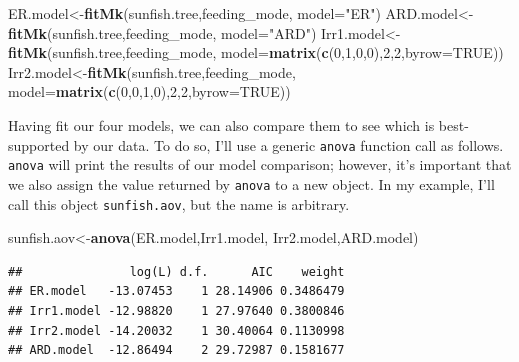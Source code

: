 \documentclass[fleqn,10pt,lineno]{wlpeerj} %
\newenvironment{Shaded}{\begin{snugshade}}{\end{snugshade}}
\newcommand{\AttributeTok}[1]{\textcolor[rgb]{0.13,0.29,0.53}{#1}}
\newcommand{\ConstantTok}[1]{\textcolor[rgb]{0.56,0.35,0.01}{#1}}
\newcommand{\DecValTok}[1]{\textcolor[rgb]{0.00,0.00,0.81}{#1}}
\newcommand{\FunctionTok}[1]{\textcolor[rgb]{0.13,0.29,0.53}{\textbf{#1}}}
\newcommand{\NormalTok}[1]{#1}
\newcommand{\OtherTok}[1]{\textcolor[rgb]{0.56,0.35,0.01}{#1}}
\newcommand{\StringTok}[1]{\textcolor[rgb]{0.31,0.60,0.02}{#1}}
\begin{document}
\begin{Shaded}
\begin{Highlighting}[]
\NormalTok{ER.model}\OtherTok{\textless{}{-}}\FunctionTok{fitMk}\NormalTok{(sunfish.tree,feeding\_mode,}
  \AttributeTok{model=}\StringTok{"ER"}\NormalTok{)}
\NormalTok{ARD.model}\OtherTok{\textless{}{-}}\FunctionTok{fitMk}\NormalTok{(sunfish.tree,feeding\_mode,}
  \AttributeTok{model=}\StringTok{"ARD"}\NormalTok{)}
\NormalTok{Irr1.model}\OtherTok{\textless{}{-}}\FunctionTok{fitMk}\NormalTok{(sunfish.tree,feeding\_mode,}
  \AttributeTok{model=}\FunctionTok{matrix}\NormalTok{(}\FunctionTok{c}\NormalTok{(}\DecValTok{0}\NormalTok{,}\DecValTok{1}\NormalTok{,}\DecValTok{0}\NormalTok{,}\DecValTok{0}\NormalTok{),}\DecValTok{2}\NormalTok{,}\DecValTok{2}\NormalTok{,}\AttributeTok{byrow=}\ConstantTok{TRUE}\NormalTok{))}
\NormalTok{Irr2.model}\OtherTok{\textless{}{-}}\FunctionTok{fitMk}\NormalTok{(sunfish.tree,feeding\_mode,}
  \AttributeTok{model=}\FunctionTok{matrix}\NormalTok{(}\FunctionTok{c}\NormalTok{(}\DecValTok{0}\NormalTok{,}\DecValTok{0}\NormalTok{,}\DecValTok{1}\NormalTok{,}\DecValTok{0}\NormalTok{),}\DecValTok{2}\NormalTok{,}\DecValTok{2}\NormalTok{,}\AttributeTok{byrow=}\ConstantTok{TRUE}\NormalTok{))}
\end{Highlighting}
\end{Shaded}

Having fit our four models, we can also compare them to see which is best-supported by our data. To do so, I'll use a generic \texttt{anova} function call as follows. \texttt{anova} will print the results of our model comparison; however, it's important that we also assign the value returned by \texttt{anova} to a new object. In my example, I'll call this object \texttt{sunfish.aov}, but the name is arbitrary.

\begin{Shaded}
\begin{Highlighting}[]
\NormalTok{sunfish.aov}\OtherTok{\textless{}{-}}\FunctionTok{anova}\NormalTok{(ER.model,Irr1.model,}
\NormalTok{  Irr2.model,ARD.model)}
\end{Highlighting}
\end{Shaded}

\begin{verbatim}
##               log(L) d.f.      AIC    weight
## ER.model   -13.07453    1 28.14906 0.3486479
## Irr1.model -12.98820    1 27.97640 0.3800846
## Irr2.model -14.20032    1 30.40064 0.1130998
## ARD.model  -12.86494    2 29.72987 0.1581677
\end{verbatim}
\end{document}
